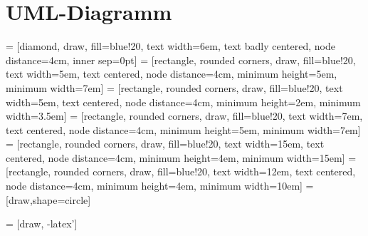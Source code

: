 \section{UML-Diagramm}\label{sec:UML-Diagramm}

 = [diamond,                    draw, fill=blue!20, text width=6em, text badly centered, node distance=4cm, inner sep=0pt]
 =    [rectangle, rounded corners, draw, fill=blue!20, text width=5em, text centered,       node distance=4cm, minimum height=5em, minimum width=7em]
 =    [rectangle, rounded corners, draw, fill=blue!20, text width=5em, text centered,       node distance=4cm, minimum height=2em, minimum width=3.5em]
 =    [rectangle, rounded corners, draw, fill=blue!20, text width=7em, text centered,       node distance=4cm, minimum height=5em, minimum width=7em]
 =    [rectangle, rounded corners, draw, fill=blue!20, text width=15em, text centered,       node distance=4cm, minimum height=4em, minimum width=15em]
 =    [rectangle, rounded corners, draw, fill=blue!20, text width=12em, text centered,       node distance=4cm, minimum height=4em, minimum width=10em]
=[draw,shape=circle]

 = [draw, -latex']


